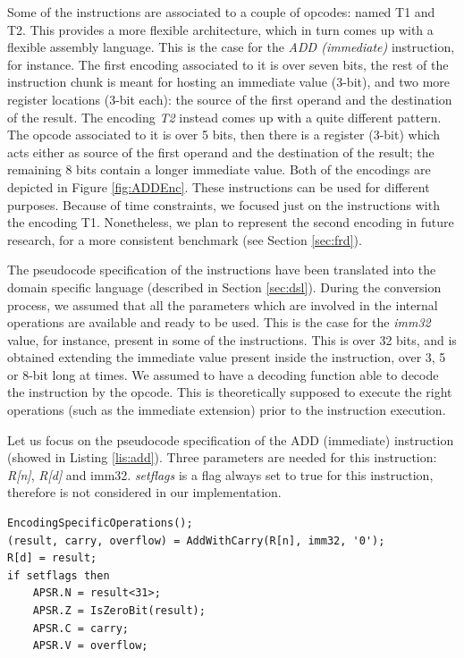 \documentclass[conference]{IEEEtran}
\begin{document}
Some of the instructions are associated to a couple of opcodes: named T1 and
T2. This provides a more flexible architecture, which in turn comes up with a
flexible assembly language. This is the case for the \textit{ADD (immediate)} instruction,
for instance. The first encoding associated to it is over seven bits, the rest of the
instruction chunk is meant for hosting an immediate value (3-bit), and two more register
locations (3-bit each): the source of the first operand and the destination of the result.
The encoding \textit{T2} instead comes up with a quite different pattern. The opcode
associated to it is over 5 bits, then there is a register (3-bit) which acts either as source
of the first operand and the destination of the result; the remaining 8 bits contain a longer
immediate value. Both of the encodings are depicted in Figure \ref{fig:ADDEnc}. These
instructions can be used for different purposes. Because of time constraints, we focused just
on the instructions with the encoding T1. Nonetheless, we plan to represent the
second encoding in future research, for a more consistent benchmark (see Section
\ref{sec:frd}).

The pseudocode specification of the instructions have been translated into the domain
specific language (described in Section \ref{sec:dsl}). During the conversion process, we
assumed that all the parameters which are involved in the internal operations are available
and ready to be used. This is the case for the \textit{imm32} value, for instance, present in
some of the instructions. This is over 32 bits, and is obtained extending the immediate value
present inside the instruction, over 3, 5 or 8-bit long at times. We assumed to have a
decoding function able to decode the instruction by the opcode. This is theoretically
supposed to execute the right operations (such as the immediate extension) prior to the
instruction execution.

Let us focus on the pseudocode specification of the ADD (immediate) instruction (showed in
Listing \ref{lis:add}). Three parameters are needed for this instruction: \textit{R[n]},
\textit{R[d]} and imm32. \textit{setflags} is a flag always set to true for this instruction,
therefore is not considered in our implementation.\\

\begin{lstlisting}[caption=ADD (immediate) instruction - Reference specification,
frame=single, label=lis:add]
EncodingSpecificOperations();
(result, carry, overflow) = AddWithCarry(R[n], imm32, '0');
R[d] = result;
if setflags then
	APSR.N = result<31>;
	APSR.Z = IsZeroBit(result);
	APSR.C = carry;
	APSR.V = overflow;
\end{lstlisting}
\end{document}
